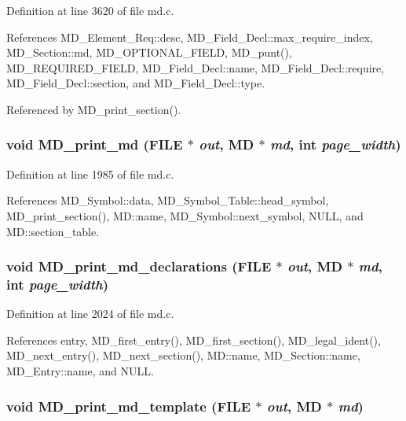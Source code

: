 Definition at line 3620 of file md.c.

References MD\_\-Element\_\-Req::desc, MD\_\-Field\_\-Decl::max\_\-require\_\-index, MD\_\-Section::md, MD\_\-OPTIONAL\_\-FIELD, MD\_\-punt(), MD\_\-REQUIRED\_\-FIELD, MD\_\-Field\_\-Decl::name, MD\_\-Field\_\-Decl::require, MD\_\-Field\_\-Decl::section, and MD\_\-Field\_\-Decl::type.

Referenced by MD\_\-print\_\-section().
\subsubsection{\setlength{\rightskip}{0pt plus 5cm}void MD\_\-print\_\-md (FILE $\ast$ {\em out}, \bf{MD} $\ast$ {\em md}, int {\em page\_\-width})}\label{md_8c_a9df1e553926805d90c54daf8439c069}




Definition at line 1985 of file md.c.

References MD\_\-Symbol::data, MD\_\-Symbol\_\-Table::head\_\-symbol, MD\_\-print\_\-section(), MD::name, MD\_\-Symbol::next\_\-symbol, NULL, and MD::section\_\-table.
\subsubsection{\setlength{\rightskip}{0pt plus 5cm}void MD\_\-print\_\-md\_\-declarations (FILE $\ast$ {\em out}, \bf{MD} $\ast$ {\em md}, int {\em page\_\-width})}\label{md_8c_f8bca4aa4b831162fb2d76ba4a86d6aa}




Definition at line 2024 of file md.c.

References entry, MD\_\-first\_\-entry(), MD\_\-first\_\-section(), MD\_\-legal\_\-ident(), MD\_\-next\_\-entry(), MD\_\-next\_\-section(), MD::name, MD\_\-Section::name, MD\_\-Entry::name, and NULL.
\subsubsection{\setlength{\rightskip}{0pt plus 5cm}void MD\_\-print\_\-md\_\-template (FILE $\ast$ {\em out}, \bf{MD} $\ast$ {\em md})}\label{md_8c_e43e8860ec5bd7831ec8dcbcd9b23cab}




